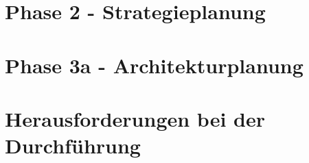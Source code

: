 \section{Phase 2 - Strategieplanung}
\label{sec:durchführung-phase2}

\section{Phase 3a - Architekturplanung}
\section{Herausforderungen bei der Durchführung}
